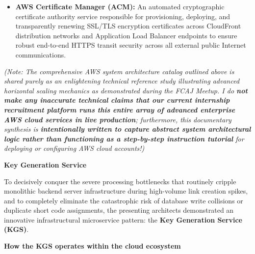 \begin{itemize}
  \textbf{AWS Secrets Manager:} A centralized, highly automated security
  credential management vault designed to store, encrypt, and seamlessly
  automate lifecycle rotation schedules for sensitive database
  authentication passwords, internal API authorization keys, and
  external service credentials---completely eliminating the dangerous
  administrative mistake of hardcoding plaintext security keys into
  source application repositories!
\item
  \textbf{AWS Certificate Manager (ACM):} An automated cryptographic
  certificate authority service responsible for provisioning, deploying,
  and transparently renewing SSL/TLS encryption certificates across
  CloudFront distribution networks and Application Load Balancer
  endpoints to ensure robust end-to-end HTTPS transit security across
  all external public Internet communications.
\end{itemize}

\emph{(Note: The comprehensive AWS system architecture catalog outlined
above is shared purely as an enlightening technical reference study
illustrating advanced horizontal scaling mechanics as demonstrated
during the FCAJ Meetup. I do \textbf{not make any inaccurate technical
claims that our current internship recruitment platform runs this entire
array of advanced enterprise AWS cloud services in live production};
furthermore, this documentary synthesis is \textbf{intentionally written
to capture abstract system architectural logic rather than functioning
as a step-by-step instruction tutorial} for deploying or configuring AWS
cloud accounts!)}

\vspace{0.5em}\noindent\textbf{Key Generation Service}\par

To decisively conquer the severe processing bottlenecks that routinely
cripple monolithic backend server infrastructure during high-volume link
creation spikes, and to completely eliminate the catastrophic risk of
database write collisions or duplicate short code assignments, the
presenting architects demonstrated an innovative infrastructural
microservice pattern: the \textbf{Key Generation Service (KGS)}.

\vspace{0.5em}\noindent\textbf{How the KGS operates within the cloud
ecosystem}\par

